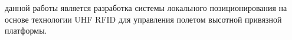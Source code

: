 


{\aim} данной работы является 
разработка системы локального позиционирования на основе технологии UHF RFID для
управления полетом высотной привязной платформы.%

